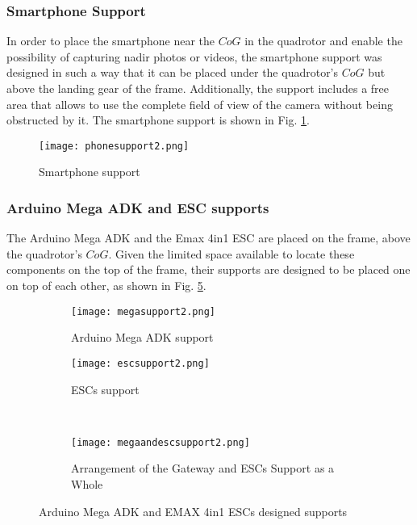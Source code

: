 \subsubsection{Smartphone Support}
In order to place the smartphone near the $CoG$ in the quadrotor and enable the possibility of capturing nadir photos or videos, the smartphone support was designed in such a way that it can be placed under the quadrotor's $CoG$ but above the landing gear of the frame. Additionally, the support includes a free area that allows to use the complete field of view of the camera without being obstructed by it. The smartphone support is shown in Fig. \ref{fig:phonesupport}.
\begin{figure}[h]
	\begin{center}
		\texttt{[image: phonesupport2.png]}    
		\caption{Smartphone support} 
		\label{fig:phonesupport}
	\end{center}
\end{figure}
\vspace{-0.5cm}
\subsubsection{Arduino Mega ADK and ESC supports}
The Arduino Mega ADK and the Emax 4in1 ESC are placed on the frame, above the quadrotor's $CoG$. Given the limited space available to locate these components on the top of the frame, their supports are designed to be placed one on top of each other, as shown in Fig. \ref{fig:megaandescsupports}.
\begin{figure}[h]
\begin{subfigure}{.5\linewidth}
\centering
\texttt{[image: megasupport2.png]}
\caption{Arduino Mega ADK support} 
\label{fig:megasupport}
\end{subfigure}%
\begin{subfigure}{.5\linewidth}
\centering
\texttt{[image: escsupport2.png]}
\caption{ESCs support} 
\label{fig:escsupport}
\end{subfigure}\\[1ex]
\begin{subfigure}{\linewidth}
\centering
\texttt{[image: megaandescsupport2.png]}
\caption{Arrangement of the Gateway and ESCs Support as a Whole} 
\label{fig:megaandescsupport}
\end{subfigure}
\caption{Arduino Mega ADK and EMAX 4in1 ESCs designed supports}
\label{fig:megaandescsupports}
\end{figure}

